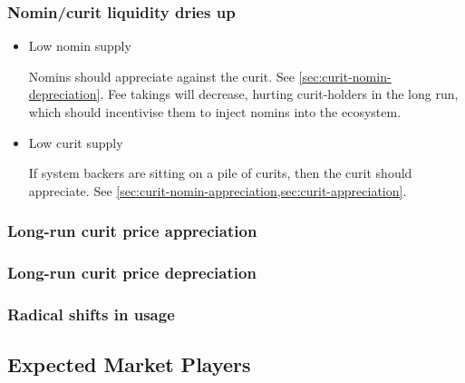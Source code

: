 \subsubsection{Nomin/curit liquidity dries up}
\begin{itemize}
	\item Low nomin supply

	Nomins should appreciate against the curit. See \cref{sec:curit-nomin-depreciation}.
	Fee takings will decrease, hurting curit-holders in the long run,
	which should incentivise them to inject nomins into the ecosystem.

	\item Low curit supply

	If system backers are sitting on a pile of curits, then the curit should
	appreciate. See \cref{sec:curit-nomin-appreciation,sec:curit-appreciation}.
\end{itemize}


\subsubsection{Long-run curit price appreciation}\label{sec:curit-appreciation}

\subsubsection{Long-run curit price depreciation}\label{sec:curit-depreciation}


\subsubsection{Radical shifts in usage}

\subsection{Expected Market Players}

